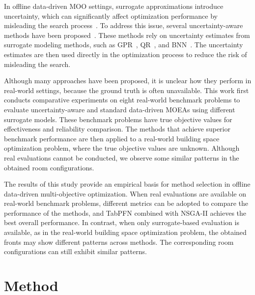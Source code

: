 \documentclass[conference]{IEEEtran}
\begin{document}
In offline data-driven \gls{MOO} settings, surrogate approximations introduce uncertainty, which can significantly affect optimization performance by misleading the search process~\cite{ddeo_2}. To address this issue, several uncertainty-aware methods have been proposed~\cite{ddeo_ibea, ddeo_rvea, ddeo-TGPR, lyu_dual_ranking}. These methods rely on uncertainty estimates from surrogate modeling methods, such as \gls{GPR}~\cite{gaussian_kernel}, \gls{QR}~\cite{quantile_regression}, and \gls{BNN}~\cite{bnn}. The uncertainty estimates are then used directly in the optimization process to reduce the risk of misleading the search.

Although many approaches have been proposed, it is unclear how they perform in real-world settings, because the ground truth is often unavailable. This work first conducts comparative experiments on eight real-world benchmark problems to evaluate uncertainty-aware and standard data-driven \gls{MOEAs} using different surrogate models. These benchmark problems have true objective values for effectiveness and reliability comparison. The methods that achieve superior benchmark performance are then applied to a real-world building space optimization problem, where the true objective values are unknown. Although real evaluations cannot be conducted, we observe some similar patterns in the obtained room configurations.

The results of this study provide an empirical basis for method selection in offline data-driven multi-objective optimization. When real evaluations are available on real-world benchmark problems, different metrics can be adopted to compare the performance of the methods, and TabPFN combined with NSGA-II achieves the best overall performance. In contrast, when only surrogate-based evaluation is available, as in the real-world building space optimization problem, the obtained fronts may show different patterns across methods. The corresponding room configurations can still exhibit similar patterns.



\section{Method}
\end{document}
